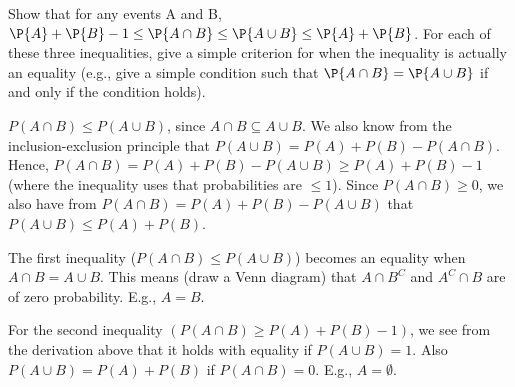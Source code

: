 
\setcounter{theorem}{20}

\begin{exercise}[BH.1.43]
	Show that for any events A and B, $\P{A} + \P{B} - 1 \leq \P{A \cap B} \leq \P{A \cup B} \leq \P{A} + \P{B}$. For each of these three inequalities, give a simple criterion for when the inequality is actually an equality (e.g., give a simple condition such that $\P{A \cap B} = \P{A \cup B}$ if and only if the condition holds).
\begin{solution}
	$P(A\cap B)\leq P(A\cup B)$, since $A\cap B\subseteq A\cup B$. We also know from the inclusion-exclusion principle that $P(A\cup B) = P(A) + P(B)-P(A\cap B)$. Hence, $P(A\cap B) = P(A)+P(B)-P(A\cup B)\geq P(A) + P(B)-1$ (where the inequality uses that probabilities are $\leq 1$). Since $P(A\cap B)\geq 0$, we also have from $P(A\cap B) = P(A)+P(B)-P(A\cup B)$ that $P(A\cup B)\leq P(A) + P(B)$.

	The first inequality ($P(A\cap B)\leq P(A\cup B)$) becomes an equality when $A\cap B= A\cup B$. This means (draw a Venn diagram) that $A\cap B^{C}$ and $A^{C}\cap B$ are of zero probability. E.g., $A=B$.

	For the second inequality $(P(A\cap B) \geq P(A) + P(B)-1)$, we see from the derivation above that it holds with equality if $P(A\cup B)=1$. Also $P(A\cup B)=P(A)+P(B)$ if $P(A\cap B)=0$. E.g., $A=\emptyset$.
\end{solution}
\end{exercise}

